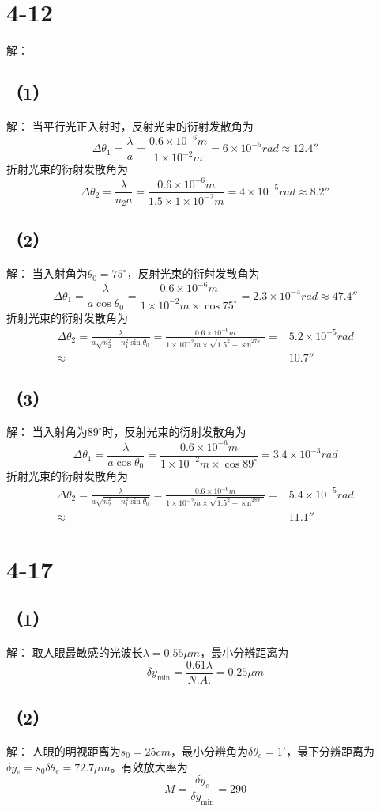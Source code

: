 \documentclass[10pt,a4paper]{article}
\begin{document}
\section*{4-12}解：
\subsection*{（1）}解：
当平行光正入射时，反射光束的衍射发散角为
\[
\Delta\theta_1=\frac{\lambda}{a}=\frac{0.6\times10^{-6}m}{1\times10^{-2}m}=6\times10^{-5}rad\approx12.4''
\]
折射光束的衍射发散角为
\[
\Delta\theta_2=\frac{\lambda}{n_2a}=\frac{0.6\times10^{-6}m}{1.5\times1\times10^{-2}m}=4\times10^{-5}rad\approx8.2''
\]
\subsection*{（2）}解：
当入射角为$\theta_0=75^{\circ}$，反射光束的衍射发散角为
\[
\Delta\theta_1=\frac{\lambda}{a\cos\theta_0}=\frac{0.6\times10^{-6}m}{1\times10^{-2}m\times\cos75^{\circ}}=2.3\times10^{-4}rad\approx47.4''
\]
折射光束的衍射发散角为
\begin{align*}
\Delta\theta_2=\frac{\lambda}{a\sqrt{n_2^2-n_1^2\sin\theta_0}}=\frac{0.6\times10^{-6}m}{1\times10^{-2}m\times\sqrt{1.5^2-\sin^275^{\circ}}}=&5.2\times10^{-5}rad\\
\approx&10.7''
\end{align*}
\subsection*{（3）}解：
当入射角为$89^{\circ}$时，反射光束的衍射发散角为
\[
\Delta\theta_1=\frac{\lambda}{a\cos\theta_0}=\frac{0.6\times10^{-6}m}{1\times10^{-2}m\times\cos89^{\circ}}=3.4\times10^{-3}rad
\]
折射光束的衍射发散角为
\begin{align*}
\Delta\theta_2=\frac{\lambda}{a\sqrt{n_2^2-n_1^2\sin\theta_0}}=\frac{0.6\times10^{-6}m}{1\times10^{-2}m\times\sqrt{1.5^2-\sin^289^{\circ}}}=&5.4\times10^{-5}rad\\
\approx&11.1''
\end{align*}
\section*{4-17}
\subsection*{（1）}解：
取人眼最敏感的光波长$\lambda=0.55\mu m$，最小分辨距离为
\[
\delta y_{\min}=\frac{0.61\lambda}{N.A.}=0.25\mu m
\]
\subsection*{（2）}解：
人眼的明视距离为$s_0=25cm$，最小分辨角为$\delta\theta_{e}=1'$，最下分辨距离为$\delta y_{e}=s_0\delta\theta_{e}=72.7\mu m$。有效放大率为
\[
M=\frac{\delta y_e}{\delta y_{\min}}=290
\]
\end{document}
